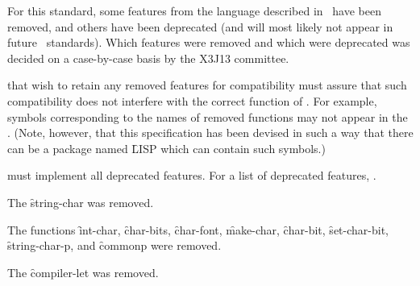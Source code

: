 

For this standard,
    some features from the language described in \CLtL\ have been removed,
and others have been deprecated (and will most likely not appear
in future \clisp\ standards).
Which features were removed and which were deprecated
was decided on a case-by-case basis by the X3J13 committee.
 
 that wish to retain any removed 
features for compatibility must assure that such compatibility 
does not interfere with the correct function of .
For example, symbols corresponding to the names of removed functions
may not appear in the .
(Note, however, that this specification has been devised in such a way 
that there can be a package named \f{LISP} which can contain such symbols.)

 must implement all deprecated features.
For a list of deprecated features, \seesection\DeprecatedFeatures.

\endsubSection%


The  \f{string-char} was removed.

\endsubsection%


The functions
\f{int-char},
\f{char-bits},
\f{char-font},
\f{make-char},
\f{char-bit},
\f{set-char-bit},
\f{string-char-p},
%
and \f{commonp}
%
%
were removed.

The  \f{compiler-let} was removed.

\endsubsection%

